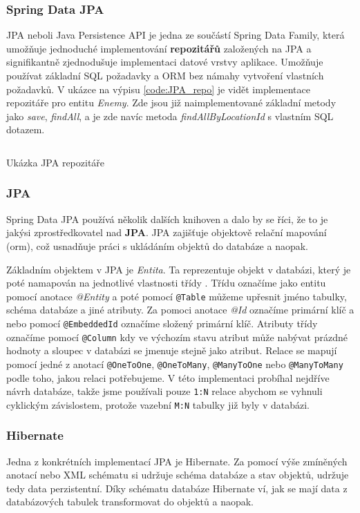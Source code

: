 \subsubsection*{Spring Data JPA} \label{sec:impl:spring:data:jpa}
JPA neboli Java Persistence API je jedna ze součástí Spring Data Family, která umožňuje jednoduché implementování \textbf{repozitářů} založených na JPA a signifikantně zjednodušuje implementaci datové vrstvy aplikace. Umožňuje používat základní SQL požadavky a ORM bez námahy vytvoření vlastních požadavků. V ukázce na výpisu \ref{code:JPA_repo} je vidět implementace repozitáře pro entitu \textit{Enemy}. Zde jsou již naimplementované základní metody jako \textit{save}, \textit{findAll}, a je zde navíc metoda \textit{findAllByLocationId} s vlastním SQL dotazem.

\begin{listing}[ht!]
    \inputminted[]{Java}{resources/code/impl/EnemyRepo.java}
    \caption{Ukázka JPA repozitáře}
    \label{code:JPA_repo}
\end{listing}

\subsubsection*{JPA}
Spring Data JPA používá několik dalších knihoven a dalo by se říci, že to je jakýsi zprostředkovatel nad \textbf{JPA}. JPA zajišťuje objektově relační mapování (\gls{orm}), což usnadňuje práci s ukládáním objektů do databáze a naopak.

Základním objektem v JPA je \textit{Entita}. Ta reprezentuje objekt v databázi, který je poté namapován na jednotlivé vlastnosti třídy . Třídu označíme jako entitu pomocí anotace \textit{@Entity} a poté pomocí \texttt{@Table} můžeme upřesnit jméno tabulky, schéma databáze a jiné atributy. Za pomoci anotace \textit{@Id} označíme primární klíč a nebo pomocí \texttt{@EmbeddedId} označíme složený primární klíč. Atributy třídy označíme pomocí \texttt{@Column} kdy ve výchozím stavu atribut může nabývat prázdné hodnoty a sloupec v databázi se jmenuje stejně jako atribut. Relace se mapují pomocí jedné z anotací \texttt{@OneToOne}, \texttt{@OneToMany}, \texttt{@ManyToOne} nebo \texttt{@ManyToMany} podle toho, jakou relaci potřebujeme. V této implementaci probíhal nejdříve návrh databáze, takže jsme používali pouze \texttt{1:N} relace abychom se vyhnuli cyklickým závislostem, protože vazební \texttt{M:N} tabulky již byly v databázi.

\subsubsection*{Hibernate}\label{sec:impl:hibernate}
Jedna z konkrétních implementací JPA je Hibernate. Za pomocí výše zmíněných anotací nebo XML  schématu si udržuje schéma databáze a stav objektů, udržuje tedy data perzistentní. Díky schématu databáze Hibernate ví, jak se mají data z databázových tabulek transformovat do objektů a naopak. \cite[]{enwiki:1217225259}

